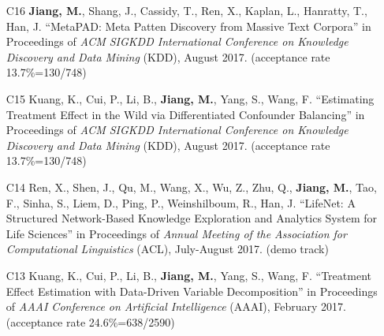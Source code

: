 \documentclass[10pt]{article}
\newenvironment{myindentpar}[1]%
{\begin{list}{}%
         {\setlength{\leftmargin}{#1}}%
         \item[]%
}
{\end{list}}
\newcounter{list}
\newcommand{\hide}[1]{}
\begin{document}
\begin{myindentpar}{0.00cm}
\begin{enumerate}[leftmargin=.5cm]
	\hide{\vspace{-0.1cm}\hspace{0.5cm}{\small \emph{I made 30\% contribution and Mr. Zhao made 60\%. Mr. Zhao conceived the idea in consultation with myself. Mr. Zhao implemented the system and completed the experiments. I wrote the introduction section. Mr. Zhao wrote the rest of the paper.}}}

\item[C16] \textbf{Jiang, M.}, Shang, J., Cassidy, T., Ren, X., Kaplan, L., Hanratty, T., Han, J. ``MetaPAD: Meta Patten Discovery from Massive Text Corpora'' in Proceedings of \emph{ACM SIGKDD International Conference on Knowledge Discovery and Data Mining} (KDD), August 2017. (acceptance rate 13.7\%=130/748)

	\hide{\vspace{-0.1cm}\hspace{0.5cm}{\small \emph{I conceived the idea, designed the study, did the experiments, and wrote the paper. Dr. Han edited the paper.}}}

\item[C15] Kuang, K., Cui, P., Li, B., \textbf{Jiang, M.}, Yang, S., Wang, F. ``Estimating Treatment Effect in the Wild via Differentiated Confounder Balancing'' in Proceedings of \emph{ACM SIGKDD International Conference on Knowledge Discovery and Data Mining} (KDD), August 2017. (acceptance rate 13.7\%=130/748)

	\hide{\vspace{-0.1cm}\hspace{0.5cm}{\small \emph{Mr. Kuang conceived the idea in consultation with myself. Mr. Kuang implemented the system and completed the experiments. Mr. Kuang wrote the paper.}}}

\item[C14] Ren, X., Shen, J., Qu, M., Wang, X., Wu, Z., Zhu, Q., \textbf{Jiang, M.}, Tao, F., Sinha, S., Liem, D., Ping, P., Weinshilboum, R., Han, J. ``LifeNet: A Structured Network-Based Knowledge Exploration and Analytics System for Life Sciences'' in Proceedings of \emph{Annual Meeting of the Association for Computational Linguistics} (ACL), July-August 2017. (demo track)

	\hide{\vspace{-0.1cm}\hspace{0.5cm}{\small \emph{Mr. Ren conceived the idea. Mr. Shen implemented the system and completed the experiments. Mr. Ren wrote the paper. I edited the paper.}}}

\item[C13] Kuang, K., Cui, P., Li, B., \textbf{Jiang, M.}, Yang, S., Wang, F. ``Treatment Effect Estimation with Data-Driven Variable Decomposition'' in Proceedings of \emph{AAAI Conference on Artificial Intelligence} (AAAI), February 2017. (acceptance rate 24.6\%=638/2590)


\end{enumerate}
\end{myindentpar}
\end{document}

